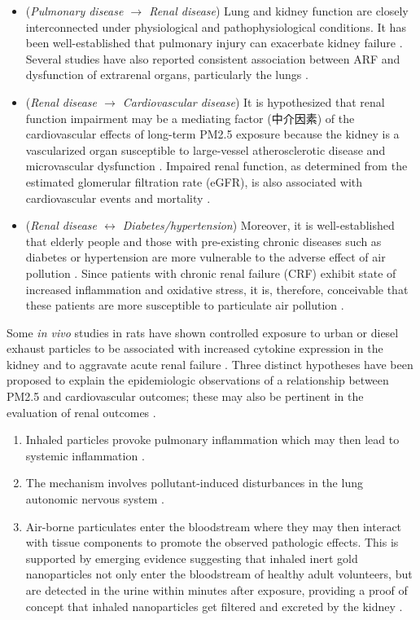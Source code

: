 \documentclass{article}
\begin{document}
\begin{itemize}
    \item (\textit{Pulmonary disease $\rightarrow$ Renal disease}) Lung and kidney function are closely interconnected under physiological and pathophysiological conditions. It has been well-established that pulmonary injury can exacerbate kidney failure \citep{pierson2006respiratory}. Several studies have also reported consistent association between ARF and dysfunction of extrarenal organs, particularly the lungs \citep{hoke2007acute, pierson2006respiratory}.
    \item (\textit{Renal disease $\rightarrow$ Cardiovascular disease}) It is hypothesized that renal function impairment may be a mediating factor (中介因素) of the cardiovascular effects of long-term PM2.5 exposure because the kidney is a vascularized organ susceptible to large-vessel atherosclerotic disease and microvascular dysfunction \citep{lue2013residential}. Impaired renal function, as determined from the estimated glomerular filtration rate (eGFR), is also associated with cardiovascular events and mortality \citep{fox2012associations, go2004chronic, sarnak2003kidney}. 
    \item (\textit{Renal disease $\leftrightarrow$ Diabetes/hypertension}) Moreover, it is well-established that elderly people and those with pre-existing chronic diseases such as diabetes or hypertension are more vulnerable to the adverse effect of air pollution \citep{brook2010particulate}. Since patients with chronic renal failure (CRF) exhibit state of increased inflammation and oxidative stress, it is, therefore, conceivable that these patients are more susceptible to particulate air pollution \citep{laden2011air, huang2014impact}.
\end{itemize}

Some \textit{in vivo} studies in rats have shown controlled exposure to urban or diesel exhaust particles to be associated with increased cytokine expression in the kidney \citep{thomson2013mapping} and to aggravate acute renal failure \citep{nemmar2009diesel}. Three distinct hypotheses have been proposed to explain the epidemiologic observations of a relationship between PM2.5 and cardiovascular outcomes; these may also be pertinent in the evaluation of renal outcomes \citep{bowe2018particulate}.
\begin{enumerate}
    \item Inhaled particles provoke pulmonary inflammation which may then lead to systemic inflammation \citep{chin2014basic}.
    \item The mechanism involves pollutant-induced disturbances in the lung autonomic nervous system \citep{chin2014basic}.
    \item Air-borne particulates enter the bloodstream where they may then interact with tissue components to promote the observed pathologic effects. This is supported by emerging evidence suggesting that inhaled inert gold nanoparticles not only enter the bloodstream of healthy adult volunteers, but are detected in the urine within minutes after exposure, providing a proof of concept that inhaled nanoparticles get filtered and excreted by the kidney \citep{chin2014basic, miller2017inhaled}.
\end{enumerate}
\end{document}
